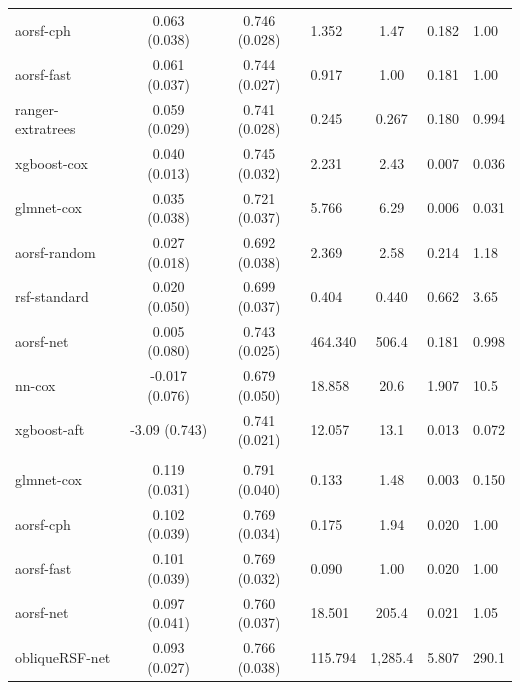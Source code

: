 \documentclass[twoside,11pt]{article}\usepackage[]{graphicx}\usepackage[]{xcolor}
\newenvironment{knitrout}{}{} %
\begin{document}
\begin{knitrout}
\begin{longtable}{lcclccl}
\hspace{1em}aorsf-cph & 0.063 (0.038) & 0.746 (0.028) & 1.352 & 1.47 & 0.182 & 1.00\\
\hspace{1em}aorsf-fast & 0.061 (0.037) & 0.744 (0.027) & 0.917 & 1.00 & 0.181 & 1.00\\
\hspace{1em}ranger-extratrees & 0.059 (0.029) & 0.741 (0.028) & 0.245 & 0.267 & 0.180 & 0.994\\
\hspace{1em}xgboost-cox & 0.040 (0.013) & 0.745 (0.032) & 2.231 & 2.43 & 0.007 & 0.036\\
\hspace{1em}glmnet-cox & 0.035 (0.038) & 0.721 (0.037) & 5.766 & 6.29 & 0.006 & 0.031\\
\hspace{1em}aorsf-random & 0.027 (0.018) & 0.692 (0.038) & 2.369 & 2.58 & 0.214 & 1.18\\
\hspace{1em}rsf-standard & 0.020 (0.050) & 0.699 (0.037) & 0.404 & 0.440 & 0.662 & 3.65\\
\hspace{1em}aorsf-net & 0.005 (0.080) & 0.743 (0.025) & 464.340 & 506.4 & 0.181 & 0.998\\
\hspace{1em}nn-cox & -0.017 (0.076) & 0.679 (0.050) & 18.858 & 20.6 & 1.907 & 10.5\\
\hspace{1em}xgboost-aft & -3.09 (0.743) & 0.741 (0.021) & 12.057 & 13.1 & 0.013 & 0.072\\
\addlinespace[0.3em]
\hline
\multicolumn{7}{l}{\textit{\textbf{FCL; death, n = 541, p = 7}}}\\
\hline
\hspace{1em}glmnet-cox & 0.119 (0.031) & 0.791 (0.040) & 0.133 & 1.48 & 0.003 & 0.150\\
\hspace{1em}aorsf-cph & 0.102 (0.039) & 0.769 (0.034) & 0.175 & 1.94 & 0.020 & 1.00\\
\hspace{1em}aorsf-fast & 0.101 (0.039) & 0.769 (0.032) & 0.090 & 1.00 & 0.020 & 1.00\\
\hspace{1em}aorsf-net & 0.097 (0.041) & 0.760 (0.037) & 18.501 & 205.4 & 0.021 & 1.05\\
\hspace{1em}obliqueRSF-net & 0.093 (0.027) & 0.766 (0.038) & 115.794 & 1,285.4 & 5.807 & 290.1\\

\end{longtable}
\end{knitrout}
\end{document}
